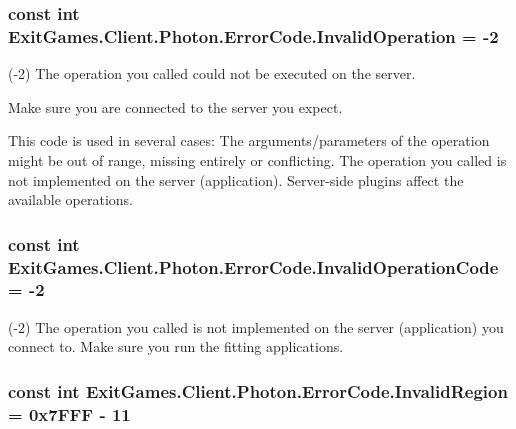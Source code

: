 \subsubsection[{\texorpdfstring{Invalid\+Operation}{InvalidOperation}}]{\setlength{\rightskip}{0pt plus 5cm}const int Exit\+Games.\+Client.\+Photon.\+Error\+Code.\+Invalid\+Operation = -\/2}\hypertarget{class_exit_games_1_1_client_1_1_photon_1_1_error_code_a326bcb717b4766d05879e49c5f04ce5e}{}\label{class_exit_games_1_1_client_1_1_photon_1_1_error_code_a326bcb717b4766d05879e49c5f04ce5e}


(-\/2) The operation you called could not be executed on the server. 

Make sure you are connected to the server you expect.

This code is used in several cases\+: The arguments/parameters of the operation might be out of range, missing entirely or conflicting. The operation you called is not implemented on the server (application). Server-\/side plugins affect the available operations. 
\subsubsection[{\texorpdfstring{Invalid\+Operation\+Code}{InvalidOperationCode}}]{\setlength{\rightskip}{0pt plus 5cm}const int Exit\+Games.\+Client.\+Photon.\+Error\+Code.\+Invalid\+Operation\+Code = -\/2}\hypertarget{class_exit_games_1_1_client_1_1_photon_1_1_error_code_a8d0df840a8f536d2466ee21ad7b293b1}{}\label{class_exit_games_1_1_client_1_1_photon_1_1_error_code_a8d0df840a8f536d2466ee21ad7b293b1}


(-\/2) The operation you called is not implemented on the server (application) you connect to. Make sure you run the fitting applications.

\subsubsection[{\texorpdfstring{Invalid\+Region}{InvalidRegion}}]{\setlength{\rightskip}{0pt plus 5cm}const int Exit\+Games.\+Client.\+Photon.\+Error\+Code.\+Invalid\+Region = 0x7\+F\+F\+F -\/ 11}\hypertarget{class_exit_games_1_1_client_1_1_photon_1_1_error_code_ab6f8b7f747bbd61aa8e9853c2a4194f6}{}\label{class_exit_games_1_1_client_1_1_photon_1_1_error_code_ab6f8b7f747bbd61aa8e9853c2a4194f6}


